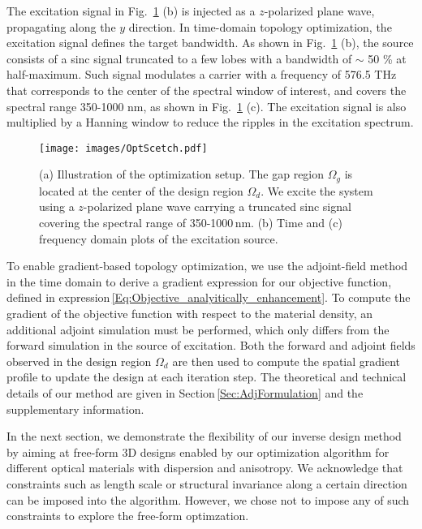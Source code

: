 \documentclass[aps,prl,twocolumn,superscriptaddress,longbibliography]{revtex4-1}
\begin{document}
The excitation signal in Fig.~\ref{Signal} (b) is injected as a $z$-polarized plane wave, propagating along the $y$ direction. 
In time-domain topology optimization, the excitation signal defines the target bandwidth. As shown in Fig.~\ref{Signal} (b), the source consists of a sinc signal truncated to a few lobes with a bandwidth of $\sim$ 50 \% at half-maximum. Such signal modulates a carrier with a frequency of 576.5 THz that corresponds to the center of the spectral window of interest, and covers the spectral range 350-1000 nm, as shown in Fig.~\ref{Signal} (c). 
The excitation signal is also multiplied by a Hanning window to reduce the ripples in the excitation spectrum.

\begin{figure}[t!]
\texttt{[image: images/OptScetch.pdf]}
\caption{\label{Signal} (a) Illustration of the optimization setup. The gap region $\Omega_{g}$ is located at the center of the design region $\Omega_{d}$. We excite the system using a $z$-polarized plane wave carrying a truncated sinc signal covering the spectral range of 350-1000\,nm. (b) Time and (c) frequency domain plots of the excitation source.}
\end{figure}

To enable gradient-based topology optimization, we use the adjoint-field method in the time domain to derive a gradient expression for our objective function, defined in expression\,\eqref{Eq:Objective_analyitically_enhancement}.
To compute the gradient of the objective function with respect to the material density, an additional adjoint simulation must be performed, which only differs from the forward simulation in the source of excitation. 
Both the forward and adjoint fields observed in the design region $\Omega_{d}$ are then used to compute the spatial gradient profile to update the design at each iteration step. 
The theoretical and technical details of our method are given in Section\,\ref{Sec:AdjFormulation} and the supplementary information.\par
In the next section, we demonstrate the flexibility of our inverse design method by aiming at free-form 3D designs enabled by our optimization algorithm for different optical materials with dispersion and anisotropy. 
We acknowledge that constraints such as length scale or structural invariance along a certain direction can be imposed into the algorithm. However, we chose not to impose any of such constraints to explore the free-form optimzation.
\end{document}
